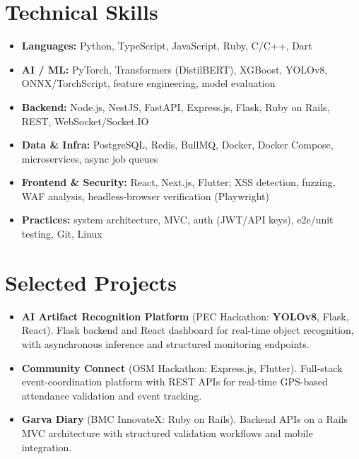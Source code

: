 \documentclass[a4paper,10pt]{article}
\begin{document}
\section*{Technical Skills}

\begin{itemize}
\item \textbf{Languages:} Python, TypeScript, JavaScript, Ruby, C/C++, Dart
\item \textbf{AI / ML:} PyTorch, Transformers (DistilBERT), XGBoost, YOLOv8, ONNX/TorchScript, feature engineering, model evaluation
\item \textbf{Backend:} Node.js, NestJS, FastAPI, Express.js, Flask, Ruby on Rails, REST, WebSocket/Socket.IO
\item \textbf{Data \& Infra:} PostgreSQL, Redis, BullMQ, Docker, Docker Compose, microservices, async job queues
\item \textbf{Frontend \& Security:} React, Next.js, Flutter; XSS detection, fuzzing, WAF analysis, headless-browser verification (Playwright)
\item \textbf{Practices:} system architecture, MVC, auth (JWT/API keys), e2e/unit testing, Git, Linux
\end{itemize}

\section*{Selected Projects}

\begin{itemize}
\item \textbf{AI Artifact Recognition Platform} {\color{rulegray}\small(PEC Hackathon: \textbf{YOLOv8}, Flask, React)}. Flask backend and React dashboard for real-time object recognition, with asynchronous inference and structured monitoring endpoints.
\item \textbf{Community Connect} {\color{rulegray}\small(OSM Hackathon: Express.js, Flutter)}. Full-stack event-coordination platform with REST APIs for real-time GPS-based attendance validation and event tracking.
\item \textbf{Garva Diary} {\color{rulegray}\small(BMC InnovateX: Ruby on Rails)}. Backend APIs on a Rails MVC architecture with structured validation workflows and mobile integration.
\end{itemize}

\end{document}
